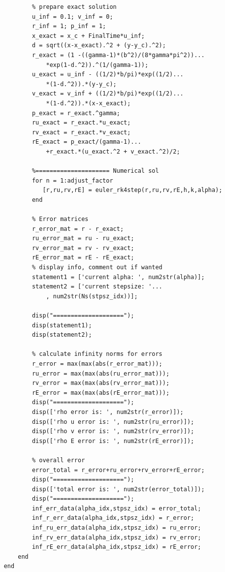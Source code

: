 \documentclass[12pt]{article}
\begin{document}
\begin{verbatim}
            % prepare exact solution
            u_inf = 0.1; v_inf = 0;
            r_inf = 1; p_inf = 1;
            x_exact = x_c + FinalTime*u_inf;
            d = sqrt((x-x_exact).^2 + (y-y_c).^2);
            r_exact = (1 -((gamma-1)*(b^2)/(8*gamma*pi^2))...
                *exp(1-d.^2)).^(1/(gamma-1));
            u_exact = u_inf - ((1/2)*b/pi)*exp((1/2)...
                *(1-d.^2)).*(y-y_c);
            v_exact = v_inf + ((1/2)*b/pi)*exp((1/2)...
                *(1-d.^2)).*(x-x_exact);
            p_exact = r_exact.^gamma;
            ru_exact = r_exact.*u_exact;
            rv_exact = r_exact.*v_exact;
            rE_exact = p_exact/(gamma-1)...
                +r_exact.*(u_exact.^2 + v_exact.^2)/2;

            %===================== Numerical sol
            for n = 1:adjust_factor
               [r,ru,rv,rE] = euler_rk4step(r,ru,rv,rE,h,k,alpha);
            end

            % Error matrices
            r_error_mat = r - r_exact;
            ru_error_mat = ru - ru_exact;
            rv_error_mat = rv - rv_exact;
            rE_error_mat = rE - rE_exact;
            % display info, comment out if wanted
            statement1 = ['current alpha: ', num2str(alpha)];
            statement2 = ['current stepsize: '...
                , num2str(Ns(stpsz_idx))];

            disp("====================");
            disp(statement1);
            disp(statement2);

            % calculate infinity norms for errors
            r_error = max(max(abs(r_error_mat)));
            ru_error = max(max(abs(ru_error_mat)));
            rv_error = max(max(abs(rv_error_mat)));
            rE_error = max(max(abs(rE_error_mat)));
            disp("====================");
            disp(['rho error is: ', num2str(r_error)]);
            disp(['rho u error is: ', num2str(ru_error)]);
            disp(['rho v error is: ', num2str(rv_error)]);
            disp(['rho E error is: ', num2str(rE_error)]);

            % overall error
            error_total = r_error+ru_error+rv_error+rE_error;
            disp("====================");
            disp(['total error is: ', num2str(error_total)]);
            disp("====================");
            inf_err_data(alpha_idx,stpsz_idx) = error_total;
            inf_r_err_data(alpha_idx,stpsz_idx) = r_error;
            inf_ru_err_data(alpha_idx,stpsz_idx) = ru_error;
            inf_rv_err_data(alpha_idx,stpsz_idx) = rv_error;
            inf_rE_err_data(alpha_idx,stpsz_idx) = rE_error;
        end
    end


\end{verbatim}
\end{document}
